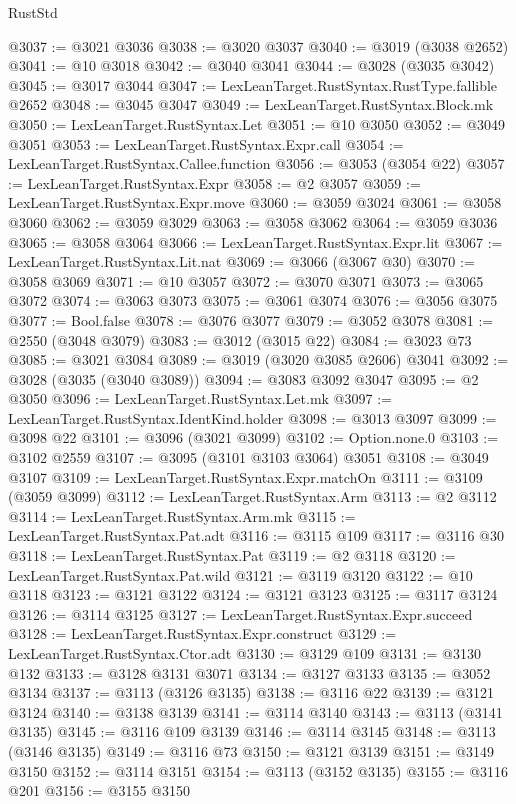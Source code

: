 \begin{lexlean}{RustStd}
\begin{coremodule}
@3037 := @3021 @3036
@3038 := @3020 @3037
@3040 := @3019 (@3038 @2652)
@3041 := @10 @3018
@3042 := @3040 @3041
@3044 := @3028 (@3035 @3042)
@3045 := @3017 @3044
@3047 := LexLeanTarget.RustSyntax.RustType.fallible @2652
@3048 := @3045 @3047
@3049 := LexLeanTarget.RustSyntax.Block.mk
@3050 := LexLeanTarget.RustSyntax.Let
@3051 := @10 @3050
@3052 := @3049 @3051
@3053 := LexLeanTarget.RustSyntax.Expr.call
@3054 := LexLeanTarget.RustSyntax.Callee.function
@3056 := @3053 (@3054 @22)
@3057 := LexLeanTarget.RustSyntax.Expr
@3058 := @2 @3057
@3059 := LexLeanTarget.RustSyntax.Expr.move
@3060 := @3059 @3024
@3061 := @3058 @3060
@3062 := @3059 @3029
@3063 := @3058 @3062
@3064 := @3059 @3036
@3065 := @3058 @3064
@3066 := LexLeanTarget.RustSyntax.Expr.lit
@3067 := LexLeanTarget.RustSyntax.Lit.nat
@3069 := @3066 (@3067 @30)
@3070 := @3058 @3069
@3071 := @10 @3057
@3072 := @3070 @3071
@3073 := @3065 @3072
@3074 := @3063 @3073
@3075 := @3061 @3074
@3076 := @3056 @3075
@3077 := Bool.false
@3078 := @3076 @3077
@3079 := @3052 @3078
@3081 := @2550 (@3048 @3079)
@3083 := @3012 (@3015 @22)
@3084 := @3023 @73
@3085 := @3021 @3084
@3089 := @3019 (@3020 @3085 @2606) @3041
@3092 := @3028 (@3035 (@3040 @3089))
@3094 := @3083 @3092 @3047
@3095 := @2 @3050
@3096 := LexLeanTarget.RustSyntax.Let.mk
@3097 := LexLeanTarget.RustSyntax.IdentKind.holder
@3098 := @3013 @3097
@3099 := @3098 @22
@3101 := @3096 (@3021 @3099)
@3102 := Option.none.{0}
@3103 := @3102 @2559
@3107 := @3095 (@3101 @3103 @3064) @3051
@3108 := @3049 @3107
@3109 := LexLeanTarget.RustSyntax.Expr.matchOn
@3111 := @3109 (@3059 @3099)
@3112 := LexLeanTarget.RustSyntax.Arm
@3113 := @2 @3112
@3114 := LexLeanTarget.RustSyntax.Arm.mk
@3115 := LexLeanTarget.RustSyntax.Pat.adt
@3116 := @3115 @109
@3117 := @3116 @30
@3118 := LexLeanTarget.RustSyntax.Pat
@3119 := @2 @3118
@3120 := LexLeanTarget.RustSyntax.Pat.wild
@3121 := @3119 @3120
@3122 := @10 @3118
@3123 := @3121 @3122
@3124 := @3121 @3123
@3125 := @3117 @3124
@3126 := @3114 @3125
@3127 := LexLeanTarget.RustSyntax.Expr.succeed
@3128 := LexLeanTarget.RustSyntax.Expr.construct
@3129 := LexLeanTarget.RustSyntax.Ctor.adt
@3130 := @3129 @109
@3131 := @3130 @132
@3133 := @3128 @3131 @3071
@3134 := @3127 @3133
@3135 := @3052 @3134
@3137 := @3113 (@3126 @3135)
@3138 := @3116 @22
@3139 := @3121 @3124
@3140 := @3138 @3139
@3141 := @3114 @3140
@3143 := @3113 (@3141 @3135)
@3145 := @3116 @109 @3139
@3146 := @3114 @3145
@3148 := @3113 (@3146 @3135)
@3149 := @3116 @73
@3150 := @3121 @3139
@3151 := @3149 @3150
@3152 := @3114 @3151
@3154 := @3113 (@3152 @3135)
@3155 := @3116 @201
@3156 := @3155 @3150

\end{coremodule}
\end{lexlean}
